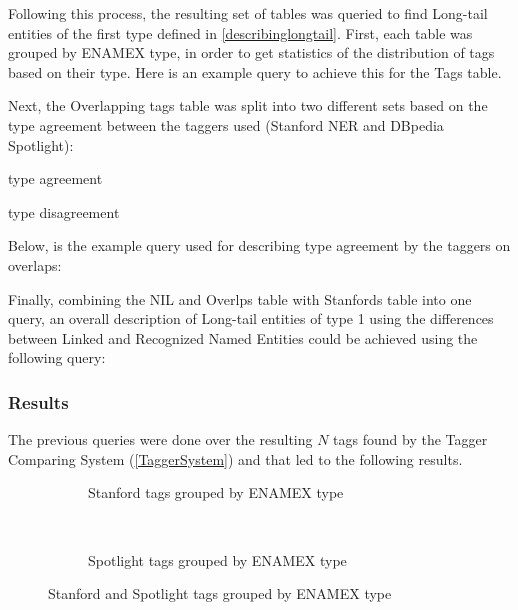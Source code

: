 Following this process, the resulting set of tables was queried to find Long-tail entities of the first type defined in \ref{describinglongtail}. 
First, each table was grouped by ENAMEX type, in order to get statistics of the distribution of tags based on their type.
Here is an example query to achieve this for the Tags table.

Next, the Overlapping tags table was split into two different sets based on the type agreement between the taggers used (Stanford NER and DBpedia Spotlight):
\begin{enumerate*}
  \item type agreement
  \item type disagreement
\end{enumerate*}
Below, is the example query used for describing type agreement by the taggers on overlaps:

Finally, combining the NIL and Overlps table with Stanfords table into one query, an overall description of Long-tail entities of type 1 using the differences
between Linked and Recognized Named Entities could be achieved using the following query:


\subsubsection{Results}
The previous queries were done over the resulting $N$ tags found by the Tagger Comparing System (\ref{TaggerSystem}) and that led to the following results.

\begin{figure*}[t!]
    \centering
    \begin{subfigure}[t]{0.5\textwidth}
        \label{fig:stanfordpertype}
        \centering
        \caption{Stanford tags grouped by ENAMEX type}
    \end{subfigure}%
    ~ 
    \begin{subfigure}[t]{0.5\textwidth}
        \label{fig:spotlightpertype}
        \centering
        \caption{Spotlight tags grouped by ENAMEX type}
    \end{subfigure}
    \caption{Stanford and Spotlight tags grouped by ENAMEX type}
\end{figure*}


